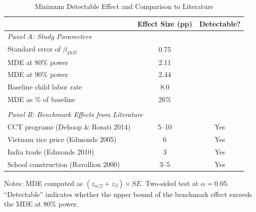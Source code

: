 \begin{table}[H]
\centering
\caption{Minimum Detectable Effect and Comparison to Literature}
\label{tab:power_analysis}
\begin{threeparttable}
\begin{tabular}{lcc}
\toprule
& Effect Size (pp) & Detectable? \\
\midrule
\multicolumn{3}{l}{\textit{Panel A: Study Parameters}} \\
\quad Standard error of $\hat{\beta}_{DiD}$ & 0.75 & \\
\quad MDE at 80\% power & 2.11 & \\
\quad MDE at 90\% power & 2.44 & \\
\quad Baseline child labor rate & 8.0 & \\
\quad MDE as \% of baseline & 26\% & \\
\\
\midrule
\multicolumn{3}{l}{\textit{Panel B: Benchmark Effects from Literature}} \\
\quad CCT programs (Dehoop \& Rosati 2014) & 5--10 & Yes \\
\quad Vietnam rice price (Edmonds 2005) & 6 & Yes \\
\quad India trade (Edmonds 2010) & 3 & Yes \\
\quad School construction (Ravallion 2000) & 3--5 & Yes \\
\bottomrule
\end{tabular}
\begin{tablenotes}
\footnotesize
\item Notes: MDE computed as $(z_{\alpha/2} + z_\beta) \times SE$. Two-sided test at $\alpha = 0.05$. ``Detectable'' indicates whether the upper bound of the benchmark effect exceeds the MDE at 80\% power.
\end{tablenotes}
\end{threeparttable}
\end{table}